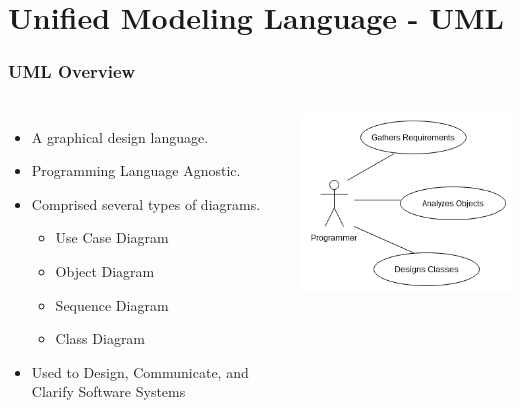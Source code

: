 \documentclass{beamer}
\begin{document}
\section{Unified Modeling Language - UML}
\begin{frame}
    \frametitle{UML Overview}
    \begin{columns}
        \begin{itemize}[<+->]
            \item A graphical design language.
            \item Programming Language Agnostic.
            \item Comprised several types of diagrams.
            \begin{itemize}[<+->]
                \item Use Case Diagram
                \item Object Diagram
                \item Sequence Diagram
                \item Class Diagram
            \end{itemize}
            \item Used to Design, Communicate, and Clarify Software Systems
        \end{itemize}
        \includegraphics[width=\textwidth]{images/programmerUseCase}
    \end{columns}
\end{frame}
\end{document}
